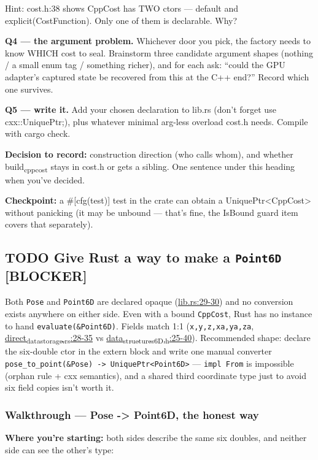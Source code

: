 \documentclass[11pt]{article}
\begin{document}
Hint: cost.h:38 shows CppCost has TWO ctors — default and
explicit(CostFunction). Only one of them is declarable. Why?

\textbf{Q4 — the argument problem.} Whichever door you pick, the factory needs
to know WHICH cost to seal. Brainstorm three candidate argument shapes
(nothing / a small enum tag / something richer), and for each ask:
``could the GPU adapter's captured state be recovered from this at the
C++ end?'' Record which one survives.

\textbf{Q5 — write it.} Add your chosen declaration to lib.rs (don't forget
use cxx::UniquePtr;), plus whatever minimal arg-less overload cost.h
needs. Compile with cargo check.

\textbf{Decision to record:} construction direction (who calls whom), and
whether build\textsubscript{cpp}\textsubscript{cost} stays in cost.h or gets a sibling. One sentence
under this heading when you've decided.

\textbf{Checkpoint:} a \#[cfg(test)] test in the crate can obtain a
UniquePtr<CppCost> without panicking (it may be unbound — that's fine,
the IsBound guard item covers that separately).
\subsection{{\bfseries\sffamily TODO} Give Rust a way to make a \texttt{Point6D} {[}BLOCKER]}
\label{sec:orgb6f1f1d}
Both \texttt{Pose} and \texttt{Point6D} are declared opaque (\href{rust/direct-rs/src/lib.rs}{lib.rs:29-30}) and no
conversion exists anywhere on either side. Even with a bound \texttt{CppCost},
Rust has no instance to hand \texttt{evaluate(\&Point6D)}. Fields match 1:1
(\texttt{x,y,z,xa,ya,za}, \href{rust/direct-rs/src/direct\_data\_storage.rs}{direct\textsubscript{data}\textsubscript{storage.rs}:28-35} vs
\href{include/domain/data\_structures\_6D.h}{data\textsubscript{structures}\textsubscript{6D.h}:25-40}). Recommended shape: declare the six-double
ctor in the extern block and write one manual converter
\texttt{pose\_to\_point(\&Pose) -> UniquePtr<Point6D>} — \texttt{impl From} is impossible
(orphan rule + cxx semantics), and a shared third coordinate type just to
avoid six field copies isn't worth it.
\subsubsection{Walkthrough — Pose -> Point6D, the honest way}
\label{sec:orga775d3a}

\textbf{Where you're starting:} both sides describe the same six doubles, and
neither side can see the other's type:
\end{document}
